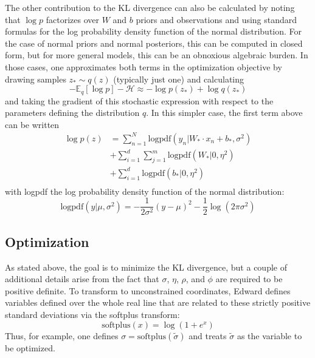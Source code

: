 \documentclass[10pt]{article}
\begin{document}
The other contribution to the KL divergence can also be calculated by noting that $\log p$ factorizes over $W$ and $b$ priors and observations and using standard formulas for the log probability density function of the normal distribution. For the case of normal priors and normal posteriors, this can be computed in closed form, but for more general models, this can be an obnoxious algebraic burden. In those cases, one approximates both terms in the optimization objective by drawing samples $z_* \sim q(z)$ (typically just one) and calculating
\begin{equation}
    -\mathbb{E}_q[\log p] - \mathcal{H} \approx -\log p(z_*) + \log q(z_*)
\end{equation}
and taking the gradient of this stochastic expression with respect to the parameters defining the distribution $q$. In this simpler case, the first term above can be written
\begin{align}
    \log p(z) &= \sum_{n = 1}^N \mathrm{logpdf}(y_n|W_*\cdot x_n + b_*, \sigma^2) \\
    &+ \sum_{i = 1}^d\sum_{j=1}^m \mathrm{logpdf}(W_*|0, \eta^2) \\
    &+ \sum_{i = 1}^d \mathrm{logpdf}(b_*|0, \eta^2) \\
\end{align}
with logpdf the log probability density function of the normal distribution:
\begin{equation}
    \mathrm{logpdf}(y|\mu, \sigma^2) = -\frac{1}{2\sigma^2}(y - \mu)^2 - \frac{1}{2}\log(2\pi \sigma^2)
\end{equation}

\subsection{Optimization}
As stated above, the goal is to minimize the KL divergence, but a couple of additional details arise from the fact that $\sigma$, $\eta$, $\rho$, and $\phi$ are required to be positive definite. To transform to unconstrained coordinates, Edward defines variables defined over the whole real line that are related to these strictly positive standard deviations via the softplus transform:
\begin{equation}
    \mathrm{softplus}(x) = \log (1 + e^x)
\end{equation}
Thus, for example, one defines $\sigma = \mathrm{softplus}(\tilde{\sigma})$ and treats $\tilde{\sigma}$ as the variable to be optimized.
\end{document}

